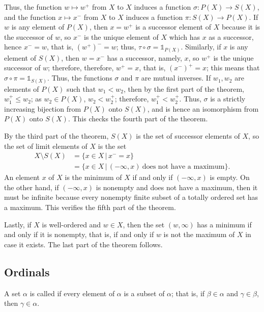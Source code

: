 \documentclass{article}
\begin{document}
Thus, the function \(w \mapsto w^+\) from \(X\) to \(X\) induces a
function \(\sigma : P(X) \to S(X)\), and the function
\(x \mapsto x^-\) from \(X\) to \(X\) induces a function
\(\pi : S(X) \to P(X)\).  If \(w\) is any element of \(P(X)\), then
\(x = w^+\) is a successor element of \(X\) because it is the
successor of \(w\), so \(x^-\) is the unique element of \(X\) which
has \(x\) as a successor, hence \(x^- = w\), that is, \((w^+)^- = w\);
thus, \(\tau \circ \sigma = \mathbb{1}_{P(X)}\).  Similarly, if \(x\)
is any element of \(S(X)\), then \(w = x^-\) has a successor, namely,
\(x\), so \(w^+\) is the unique successor of \(w\); therefore,
therefore, \(w^+ = x\), that is, \((x^-)^+ = x\); this means that
\(\sigma \circ \pi = \mathbb{1}_{S(X)}\).  Thus, the functions
\(\sigma\) and \(\pi\) are mutual inverses.  If \(w_1, w_2\) are
elements of \(P(X)\) such that \(w_1 < w_2\), then by the first part
of the theorem, \(w_1^+ \leq w_2\); as \(w_2 \in P(X)\),
\(w_2 < w_2^+\); therefore, \(w_1^+ < w_2^+\).  Thus, \(\sigma\) is a
strictly increasing bijection from \(P(X)\) onto \(S(X)\), and is
hence an isomorphism from \(P(X)\) onto \(S(X)\).  This checks the
fourth part of the theorem.

By the third part of the theorem, \(S(X)\) is the set of successor
elements of \(X\), so the set of limit elements of \(X\) is the set
\begin{align*}
  X \setminus S(X)
  &=
    \{ x \in X \,\vert\, x^- = x \} \\
  &=
    \{ x \in X \,\vert\,
    (-\infty, x) ~ \text{does not have a maximum} \}.
\end{align*}
An element \(x\) of \(X\) is the minimum of \(X\) if and only if
\((-\infty, x)\) is empty.  On the other hand, if \((-\infty, x)\) is
nonempty and does not have a maximum, then it must be infinite because
every nonempty finite subset of a totally ordered set has a maximum.
This verifies the fifth part of the theorem.

Lastly, if \(X\) is well-ordered and \(w \in X\), then the set
\((w, \infty)\) has a minimum if and only if it is nonempty, that is,
if and only if \(w\) is not the maximum of \(X\) in case it exists.
The last part of the theorem follows.

\subsection{Ordinals}
\label{sec:t851d2lg}

A set \(\alpha\) is called  if every element of
\(\alpha\) is a subset of \(\alpha\); that is, if \(\beta \in \alpha\)
and \(\gamma \in \beta\), then \(\gamma \in \alpha\).
\end{document}
